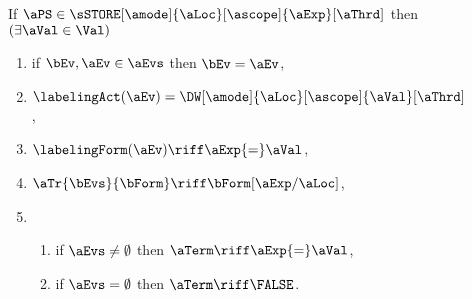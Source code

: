 \begin{figure}
  \noindent
  If $\aPS \in \sSTORE[\amode]{\aLoc}[\ascope]{\aExp}[\aThrd]$ then
  $(\exists\aVal\in\Val)$
  \begin{multicols}{2}
    \begin{enumerate}[topsep=0pt,label=(\textsc{w}\arabic*),ref=\textsc{w}\arabic*]
    \item \label{write-E}
      if $\bEv,\aEv\in\aEvs$ then $\bEv=\aEv$,
    \item \label{write-lambda}
      $\labelingAct(\aEv) = \DW[\amode]{\aLoc}[\ascope]{\aVal}[\aThrd]$,
    \item \label{write-kappa}
      \begin{math}
        \labelingForm(\aEv) \riff
        \aExp{=}\aVal
      \end{math},    
    \item \label{write-tau}
      \begin{math}
        \aTr{\bEvs}{\bForm} \riff 
        \bForm
        [\aExp/\aLoc]
      \end{math},
    \item[] 
      \begin{enumerate}[leftmargin=0pt]
      \item \label{write-term-nonempty}
        if $\aEvs\neq\emptyset$ then $\aTerm \riff \aExp{=}\aVal$,
      \item \label{write-term-empty}
        if $\aEvs=\emptyset$ then $\aTerm \riff \FALSE$.
      \end{enumerate}
    \end{enumerate}
  \end{multicols}
  \medskip


\end{figure}
